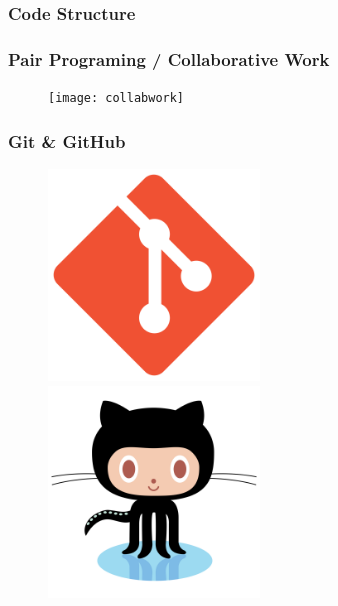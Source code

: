 \documentclass{beamer}
\begin{document}
\begin{frame}
\frametitle{Code Structure}
\begin{figure}
    
\end{figure}
\end{frame}

\begin{frame}
\frametitle{Pair Programing / Collaborative Work}
\begin{figure}
    \texttt{[image: collabwork]}
\end{figure}
\end{frame}

\begin{frame}
\frametitle{Git \& GitHub}
\begin{figure}
\includegraphics[width=0.5\textwidth]{gitlogo}
\includegraphics[width=0.5\textwidth]{octocat}
\end{figure}
\end{frame}
\end{document}
